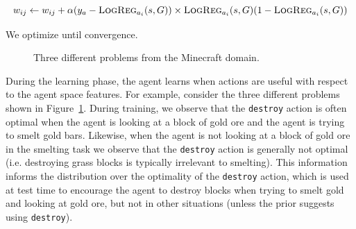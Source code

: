 \documentclass[11pt]{article}
\begin{document}
\begin{equation}
w_{ij} \leftarrow w_{ij} + \alpha(y_a - \textsc{LogReg}_{a_i}(s, G)) \times \textsc{LogReg}_{a_i}(s, G)(1 - \textsc{LogReg}_{a_i}(s, G))
\end{equation}

We optimize until convergence.

\begin{figure}
\centering
{}
  \caption{Three different problems from the Minecraft domain.}
  \label{fig:minecraft}
\end{figure}

During the learning phase, the agent learns when actions are useful
with respect to the agent space features.  For example, consider the three different
problems shown in Figure~\ref{fig:minecraft}.  During training, we observe
that the \texttt{destroy} action is often optimal when the agent is
looking at a block of gold ore and the agent is trying to smelt gold
bars.  Likewise, when the agent is not looking at a block of gold
ore in the smelting task we observe that the \texttt{destroy} action
is generally not optimal (i.e. destroying grass blocks is typically
irrelevant to smelting).  This information informs the distribution
over the optimality of the \texttt{destroy} action, which is used at
test time to encourage the agent to destroy blocks when trying to
smelt gold and looking at gold ore, but not in other situations
(unless the prior suggests using \texttt{destroy}).
\end{document}
